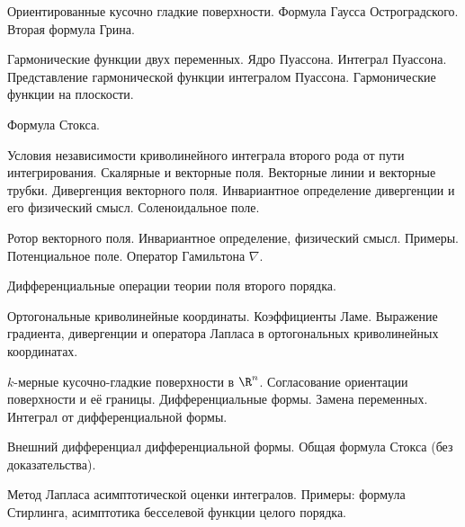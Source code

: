 \documentclass[a4paper]{article}
\begin{document}
\begin{nums}{-2}
\item Ориентированные кусочно гладкие поверхности. Формула Гаусса Остроградского. Вторая формула Грина.
\item Гармонические функции двух переменных. Ядро Пуассона. Интеграл Пуассона. Представление гармонической функции интегралом Пуассона.
Гармонические функции на плоскости.
\item Формула Стокса.
\item Условия независимости криволинейного интеграла второго рода от пути интегрирования. Скалярные и векторные поля.
Векторные линии и векторные трубки. Дивергенция векторного поля. Инвариантное определение дивергенции и его
физический смысл. Соленоидальное поле.
\item Ротор векторного поля. Инвариантное определение, физический смысл. Примеры. Потенциальное поле. Оператор
Гамильтона $\nabla$.
\item Дифференциальные операции теории поля второго порядка.
\item Ортогональные криволинейные координаты. Коэффициенты Ламе. Выражение градиента, дивергенции и оператора Лапласа в ортогональных
криволинейных координатах.
\item $k$-мерные кусочно-гладкие поверхности в $\R^n$. Согласование ориентации поверхности и её границы.
Дифференциальные формы. Замена переменных. Интеграл от дифференциальной формы.
\item Внешний дифференциал дифференциальной формы. Общая формула Стокса (без доказательства).
\item Метод Лапласа асимптотической оценки интегралов. Примеры: формула Стирлинга, асимптотика бесселевой
функции целого порядка.
\end{nums}

\medskip\dmvntrail
\end{document}
